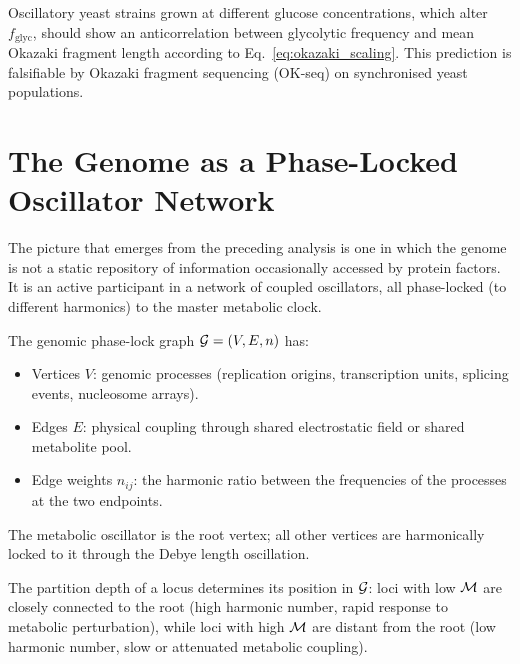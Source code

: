 \begin{proposition}
\label{prop:freq_length_anticorr}
Oscillatory yeast strains grown at different glucose concentrations, which
alter $f_{\mathrm{glyc}}$, should show an anticorrelation between glycolytic
frequency and mean Okazaki fragment length according to
Eq.~\eqref{eq:okazaki_scaling}. This prediction is falsifiable by Okazaki
fragment sequencing (OK-seq) on synchronised yeast populations.
\end{proposition}

\section{The Genome as a Phase-Locked Oscillator Network}
\label{sec:phase_locked_network}

The picture that emerges from the preceding analysis is one in which the genome
is not a static repository of information occasionally accessed by protein
factors. It is an active participant in a network of coupled oscillators, all
phase-locked (to different harmonics) to the master metabolic clock.

\begin{definition}
\label{def:phase_lock_graph}
The genomic phase-lock graph $\mathcal{G} = (V, E, n)$ has:
\begin{itemize}
  \item Vertices $V$: genomic processes (replication origins, transcription
        units, splicing events, nucleosome arrays).
  \item Edges $E$: physical coupling through shared electrostatic field or
        shared metabolite pool.
  \item Edge weights $n_{ij}$: the harmonic ratio between the frequencies of
        the processes at the two endpoints.
\end{itemize}
The metabolic oscillator is the root vertex; all other vertices are
harmonically locked to it through the Debye length oscillation.
\end{definition}

The partition depth of a locus determines its position in $\mathcal{G}$:
loci with low $\mathcal{M}$ are closely connected to the root (high harmonic
number, rapid response to metabolic perturbation), while loci with high
$\mathcal{M}$ are distant from the root (low harmonic number, slow or attenuated
metabolic coupling).

